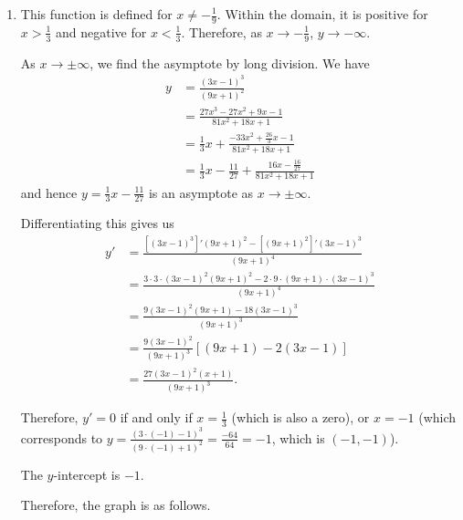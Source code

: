 \begin{enumerate}
    \item This function is defined for \(x \neq -\frac{1}{9}\). Within the domain, it is positive for \(x > \frac{1}{3}\) and negative for \(x < \frac{1}{3}\). Therefore, as \(x \to -\frac{1}{9}\), \(y \to -\infty\).

          As \(x \to \pm \infty\), we find the asymptote by long division. We have
          \begin{align*}
              y & = \frac{(3x - 1)^3}{(9x + 1)^2}                                                 \\
                & = \frac{27 x^3 - 27 x^2 + 9x - 1}{81 x^2 + 18 x + 1}                            \\
                & = \frac{1}{3}x + \frac{-33 x^2 + \frac{26}{3}x - 1}{81 x^2 + 18 x + 1}          \\
                & = \frac{1}{3}x - \frac{11}{27} + \frac{16 x - \frac{16}{27}}{81 x^2 + 18 x + 1}
          \end{align*}
          and hence \(y = \frac{1}{3}x - \frac{11}{27}\) is an asymptote as \(x \to \pm \infty\).

          Differentiating this gives us
          \begin{align*}
              y' & = \frac{\left[(3x - 1)^3\right]' (9x + 1)^2 - \left[(9x + 1)^2\right]' (3x - 1)^3}{(9x + 1)^4}         \\
                 & = \frac{3 \cdot 3 \cdot (3x - 1)^2 (9x + 1)^2 - 2 \cdot 9 \cdot (9x + 1) \cdot (3x - 1)^3}{(9x + 1)^4} \\
                 & = \frac{9 (3x - 1)^2 (9x + 1) - 18 (3x - 1)^3}{(9x + 1)^3}                                             \\
                 & = \frac{9 (3x - 1)^2}{(9x + 1)^3} \left[(9x + 1) - 2 (3x - 1)\right]                                   \\
                 & = \frac{27 (3x - 1)^2 (x + 1)}{(9x + 1)^3}.
          \end{align*}

          Therefore, \(y' = 0\) if and only if \(x = \frac{1}{3}\) (which is also a zero), or \(x = -1\) (which corresponds to \(y = \frac{(3 \cdot (-1) - 1)^3}{(9 \cdot (-1) + 1)^2} = \frac{-64}{64} = -1\), which is \((-1, -1)\)).

          The \(y\)-intercept is \(-1\).

          Therefore, the graph is as follows.

          \begin{center}
              
          \end{center}


\end{enumerate}
